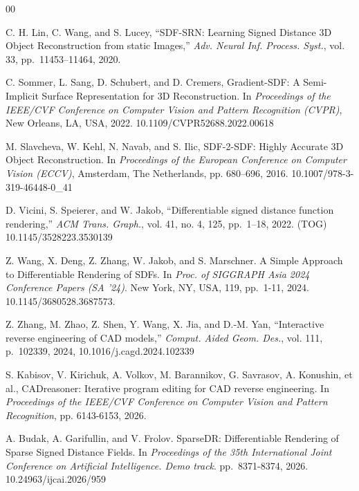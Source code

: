 \documentclass{ieeeaccess}
\begin{document}
\vspace{6pt}


\begin{thebibliography}{00}

C. H. Lin, C. Wang, and S. Lucey, ``SDF-SRN: Learning Signed Distance 3D Object Reconstruction from static Images,'' \textit{Adv. Neural Inf. Process. Syst.}, vol. 33, pp.~11453--11464, 2020.

C. Sommer, L. Sang, D. Schubert, and D. Cremers, Gradient-SDF: A Semi-Implicit Surface Representation for 3D Reconstruction. In \textit{Proceedings of the IEEE/CVF Conference on Computer Vision and Pattern Recognition (CVPR)}, New Orleans, LA, USA, 2022. 10.1109/CVPR52688.2022.00618

M. Slavcheva, W. Kehl, N. Navab, and S. Ilic, SDF-2-SDF: Highly Accurate 3D Object Reconstruction. In \textit{Proceedings of the European Conference on Computer Vision (ECCV)}, Amsterdam, The Netherlands, pp. 680--696, 2016. 10.1007/978-3-319-46448-0\_41

D. Vicini, S. Speierer, and W. Jakob, ``Differentiable signed distance function rendering,'' \textit{ACM Trans. Graph.}, vol. 41, no. 4, 125, pp.~1--18, 2022. (TOG) 10.1145/3528223.3530139

Z. Wang, X. Deng, Z. Zhang, W. Jakob, and S. Marschner. A Simple Approach to Differentiable Rendering of SDFs. In \textit{Proc. of SIGGRAPH Asia 2024 Conference Papers (SA '24)}. New York, NY, USA, 119, \mbox{pp. 1-11,} 2024. 10.1145/3680528.3687573.

Z. Zhang, M. Zhao, Z. Shen, Y. Wang, X. Jia, and D.-M. Yan, ``Interactive reverse engineering of CAD models,'' \textit{Comput. Aided Geom. Des.}, vol. 111, p.~102339, 2024, 10.1016/j.cagd.2024.102339

S. Kabisov, V. Kirichuk, A. Volkov, M. Barannikov, G. Savrasov, A. Konushin, et al., CADreasoner: Iterative program editing for CAD reverse engineering. In \textit{Proceedings of the IEEE/CVF Conference on Computer Vision and Pattern Recognition}, pp. 6143-6153, 2026.

A. Budak, A. Garifullin, and V. Frolov. SparseDR: Differentiable Rendering of Sparse Signed Distance Fields. In \textit{Proceedings of the 35th International Joint Conference on Artificial Intelligence. Demo track}. \mbox{pp.~8371-8374,} 2026. 10.24963/ijcai.2026/959


\end{thebibliography}
\end{document}
